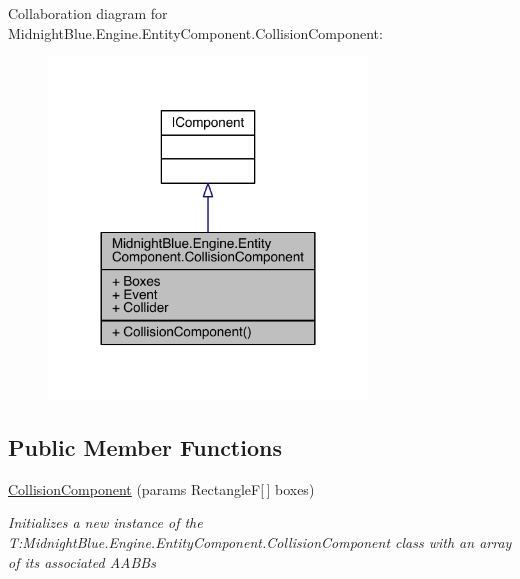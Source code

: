 Collaboration diagram for Midnight\+Blue.\+Engine.\+Entity\+Component.\+Collision\+Component\+:
\nopagebreak
\begin{figure}[H]
\begin{center}
\leavevmode
\includegraphics[width=240pt]{class_midnight_blue_1_1_engine_1_1_entity_component_1_1_collision_component__coll__graph}
\end{center}
\end{figure}
\subsection*{Public Member Functions}
\begin{DoxyCompactItemize}
\item 
\hyperlink{class_midnight_blue_1_1_engine_1_1_entity_component_1_1_collision_component_afb80f636b6d414c1ec2bba6b410dafc4}{Collision\+Component} (params RectangleF\mbox{[}$\,$\mbox{]} boxes)
\begin{DoxyCompactList}\small\item\em Initializes a new instance of the T\+:\+Midnight\+Blue.\+Engine.\+Entity\+Component.\+Collision\+Component class with an array of its associated A\+A\+BB\textquotesingle{}s \end{DoxyCompactList}\end{DoxyCompactItemize}
